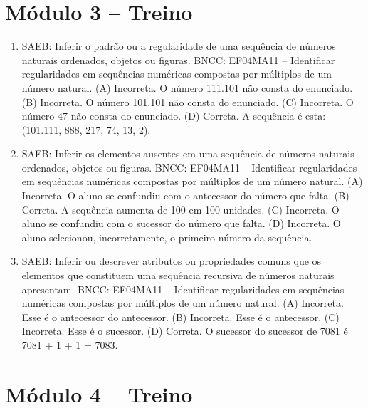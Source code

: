 \section*{Módulo 3 – Treino}

\begin{enumerate}
\item
SAEB: Inferir o padrão ou a regularidade de uma sequência de números naturais ordenados, objetos ou figuras.
BNCC: EF04MA11 -- Identificar regularidades em sequências numéricas compostas por múltiplos de um
número natural.
(A) Incorreta. O número 111.101 não consta do enunciado.
(B) Incorreta. O número 101.101 não consta do enunciado.
(C) Incorreta. O número 47 não consta do enunciado.
(D) Correta. A sequência é esta: (101.111, 888, 217, 74, 13, 2).

\item
SAEB: Inferir os elementos ausentes em uma sequência de números naturais ordenados, objetos ou figuras.
BNCC: EF04MA11 -- Identificar regularidades em sequências numéricas compostas por múltiplos de um
número natural.
(A) Incorreta. O aluno se confundiu com o antecessor do número que falta.
(B) Correta. A sequência aumenta de 100 em 100 unidades.
(C) Incorreta. O aluno se confundiu com o sucessor do número que falta.
(D) Incorreta. O aluno selecionou, incorretamente, o primeiro número da sequência.

\item
SAEB: Inferir ou descrever atributos ou propriedades comuns que os elementos que constituem uma sequência recursiva de números naturais apresentam.
BNCC: EF04MA11 -- Identificar regularidades em sequências numéricas compostas por múltiplos de um
número natural.
(A) Incorreta. Esse é o antecessor do antecessor.
(B) Incorreta. Esse é o antecessor.
(C) Incorreta. Esse é o sucessor.
(D) Correta. O sucessor do sucessor de 7081 é 7081 + 1 + 1 = 7083.
\end{enumerate}

\section*{Módulo 4 – Treino}

